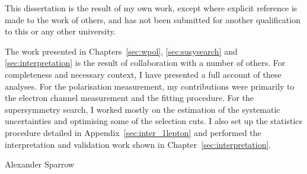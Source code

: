 \begin{declaration}
  This dissertation is the result of my own work, except where explicit
  reference is made to the work of others, and has not been submitted
  for another qualification to this or any other university.

  The work presented in Chapters~\ref{sec:wpol}, \ref{sec:susysearch} and
  \ref{sec:interpretation} is the result of collaboration with a number of
  others. For completeness and necessary context, I have presented a full
  account of these analyses. For the \PW polarisation measurement, my
  contributions were primarily to the electron channel measurement and the
  fitting procedure. For the supersymmetry search, I worked mostly on the
  estimation of the systematic uncertainties and optimising some of the
  selection cuts. I also set up the statistics procedure detailed in
  Appendix~\ref{sec:inter_1lepton} and performed the interpretation and
  validation work shown in Chapter~\ref{sec:interpretation}.

  \vspace*{1cm}
  \begin{flushright}
    Alexander Sparrow
  \end{flushright}
\end{declaration}


